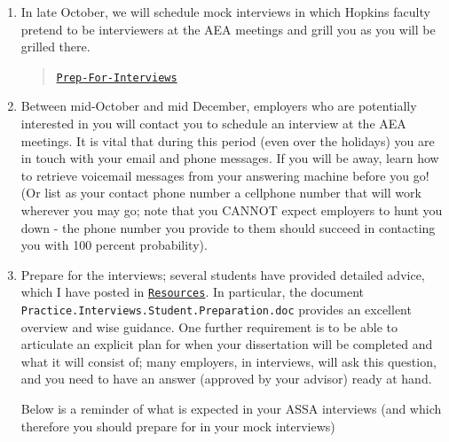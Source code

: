 \documentclass{\classes/econtex}
\begin{document}
\begin{enumerate}
  
\item In late October, we will schedule mock interviews in which Hopkins faculty pretend to be interviewers at the AEA meetings and grill you as you will be grilled there.

  \begin{quote}
    \href{\pageurl/Steps#Prep-For-Interviews}{\texttt{Prep-For-Interviews}}
  \end{quote}

  
  
  \hypertarget{Be-Reachable}{}
\item Between mid-October and mid December, employers who are
  potentially interested in you will contact you to schedule an
  interview at the AEA meetings.  It is vital that during this period
  (even over the holidays) you are in touch with your email and phone
  messages.  If you will be away, learn how to retrieve voicemail
  messages from your answering machine before you go!  (Or list as
  your contact phone number a cellphone number that will work wherever
  you may go; note that you CANNOT expect employers to hunt you down -
  the phone number you provide to them should succeed in contacting
  you with 100 percent probability).
  
  \hypertarget{Prep-For-Interviews}{} %
\item Prepare for the interviews; several students have provided
  detailed advice, which I have posted in \href{\treeurl/Resources}{\texttt{Resources}}.  In particular, the document
  \texttt{Practice.Interviews.Student.Preparation.doc} provides an
  excellent overview and wise guidance. One further requirement is to be
  able to articulate an explicit plan for when your dissertation will
  be completed and what it will consist of; many employers, in
  interviews, will ask this question, and you need to have an answer
  (approved by your advisor) ready at hand.

  Below is a reminder of what is expected in your ASSA interviews (and which therefore you should prepare for in your mock interviews)
  \begin{quote}
    \begin{itemize}


\end{itemize}
\end{quote}
\end{enumerate}
\end{document}
